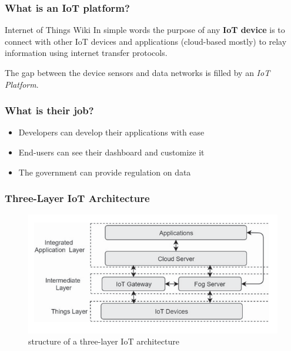 \documentclass{../iot-lecture}
\begin{document}
\begin{frame}
  \frametitle{What is an IoT platform?}
  \begin{block}{Internet of Things Wiki}
    In simple words the purpose of any \textbf{\color{YellowOrange} IoT device} is to connect with
    other IoT devices and applications (cloud-based mostly) to relay
    information using internet transfer protocols.

    The gap between the device sensors and data networks is filled
    by an \textit{\color{Green} IoT Platform}.
  \end{block}
\end{frame}

\begin{frame}
  \frametitle{What is their job?}
  \begin{itemize}
    \item Developers can develop their applications with ease
    \item End-users can see their dashboard and customize it
    \item The government can provide regulation on data
  \end{itemize}
\end{frame}

\begin{frame}
  \frametitle{Three-Layer IoT Architecture}
  \begin{figure}
    \centering
    \includegraphics[width=\textwidth]{./img/three-layer-iot-architecture.png}
    \caption{structure of a three-layer IoT architecture}
  \end{figure}
\end{frame}
\end{document}

